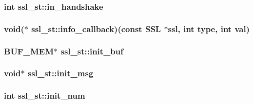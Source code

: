 \hypertarget{structssl__st_afc46f99873655d3532930b3f0abb3f98}{
\subsubsection[{in\-\_\-handshake}]{\setlength{\rightskip}{0pt plus 5cm}int ssl\-\_\-st\-::in\-\_\-handshake}}\label{structssl__st_afc46f99873655d3532930b3f0abb3f98}
\hypertarget{structssl__st_af70e998b1204131dc31d6cc12dc1ce8f}{
\subsubsection[{info\-\_\-callback}]{\setlength{\rightskip}{0pt plus 5cm}void($\ast$ ssl\-\_\-st\-::info\-\_\-callback)(const S\-S\-L $\ast$ssl, int {\bf type}, int val)}}\label{structssl__st_af70e998b1204131dc31d6cc12dc1ce8f}
\hypertarget{structssl__st_ae79d4878386098526f000f857b38854f}{
\subsubsection[{init\-\_\-buf}]{\setlength{\rightskip}{0pt plus 5cm}B\-U\-F\-\_\-\-M\-E\-M$\ast$ ssl\-\_\-st\-::init\-\_\-buf}}\label{structssl__st_ae79d4878386098526f000f857b38854f}
\hypertarget{structssl__st_a0d932f5ec1630a3cbd511548c3556a45}{
\subsubsection[{init\-\_\-msg}]{\setlength{\rightskip}{0pt plus 5cm}void$\ast$ ssl\-\_\-st\-::init\-\_\-msg}}\label{structssl__st_a0d932f5ec1630a3cbd511548c3556a45}
\hypertarget{structssl__st_a5bdef1be2cab43e264edd98f162f7fff}{
\subsubsection[{init\-\_\-num}]{\setlength{\rightskip}{0pt plus 5cm}int ssl\-\_\-st\-::init\-\_\-num}}\label{structssl__st_a5bdef1be2cab43e264edd98f162f7fff}
